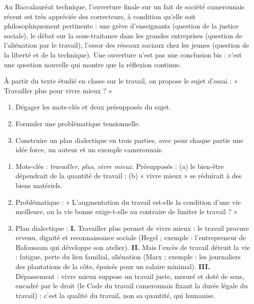 \documentclass[11pt]{article}
\begin{document}
\begin{savaistu}
Au Baccalauréat technique, l'ouverture finale sur un fait de société camerounais récent est très appréciée des correcteurs, à condition qu'elle soit philosophiquement pertinente : une grève d'enseignants (question de la justice sociale), le débat sur la sous-traitance dans les grandes entreprises (question de l'aliénation par le travail), l'essor des réseaux sociaux chez les jeunes (question de la liberté et de la technique). Une ouverture n'est pas une conclusion bis : c'est une question nouvelle qui montre que la réflexion continue.
\end{savaistu}

\begin{exercice}
À partir du texte étudié en classe sur le travail, on propose le sujet d'essai : « Travailler plus pour vivre mieux ? »
\begin{enumerate}
\item Dégager les mots-clés et deux présupposés du sujet.
\item Formuler une problématique tensionnelle.
\item Construire un plan dialectique en trois parties, avec pour chaque partie une idée force, un auteur et un exemple camerounais.
\end{enumerate}
\end{exercice}

\begin{corrige}[Exercice]
\begin{enumerate}
\item Mots-clés : \emph{travailler}, \emph{plus}, \emph{vivre mieux}. Présupposés : (a) le bien-être dépendrait de la quantité de travail ; (b) « vivre mieux » se réduirait à des biens matériels.
\item Problématique : « L'augmentation du travail est-elle la condition d'une vie meilleure, ou la vie bonne exige-t-elle au contraire de limiter le travail ? »
\item Plan dialectique : \textbf{I.} Travailler plus permet de vivre mieux : le travail procure revenu, dignité et reconnaissance sociale (Hegel ; exemple : l'entrepreneur de Bafoussam qui développe son atelier). \textbf{II.} Mais l'excès de travail détruit la vie : fatigue, perte du lien familial, aliénation (Marx ; exemple : les journaliers des plantations de la côte, épuisés pour un salaire minimal). \textbf{III.} Dépassement : vivre mieux suppose un travail juste, mesuré et doté de sens, encadré par le droit (le Code du travail camerounais fixant la durée légale du travail) : c'est la qualité du travail, non sa quantité, qui humanise.
\end{enumerate}
\end{corrige}
\end{document}
